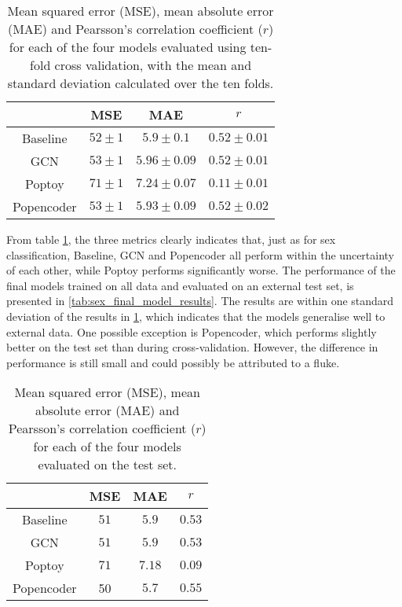 \begin{table}[H]
    \centering
    \caption{Mean squared error (MSE), mean absolute error (MAE) and Pearsson's correlation coefficient ($r$) for each of the four models evaluated using ten-fold cross validation, with the mean and standard deviation calculated over the ten folds.}
    \begin{tabular}{c|c|c|c}
         &  MSE & MAE & $r$ \\ \hline 
        Baseline &$52\pm1$& $5.9\pm0.1$&$0.52\pm0.01$\\
        GCN & $53\pm1$& $5.96\pm 0.09 $& $0.52\pm0.01$\\
        Poptoy &$71\pm 1$ & $7.24\pm0.07$ &$ 0.11\pm 0.01$\\
        Popencoder &$53\pm1$& $5.93\pm 0.09$ & $0.52\pm0.02$\\
    \end{tabular}
    \label{tab:age_model_results}
\end{table}
From table \ref{tab:age_model_results}, the three metrics clearly indicates that, just as for sex classification, Baseline, GCN and Popencoder all perform within the uncertainty of each other, while Poptoy performs significantly worse. The performance of the final models trained on all data and evaluated on an external test set, is presented in \cref{tab:sex_final_model_results}. The results are within one standard deviation of the results in \cref{tab:age_model_results}, which indicates that the models generalise well to external data. One possible exception is Popencoder, which performs slightly better on the test set than during cross-validation. However, the difference in performance is still small and could possibly be attributed to a fluke.

\begin{table}[H]
    \centering
    \caption{Mean squared error (MSE), mean absolute error (MAE) and Pearsson's correlation coefficient ($r$) for each of the four models evaluated on the test set.}
    \begin{tabular}{c|c|c|c}
         &  MSE & MAE & $r$ \\ \hline 
        Baseline & $51 $& $5.9 $&$0.53 $\\
        GCN & $51 $& $5.9  $& $0.53 $\\
        Poptoy &$71 $ & $7.18 $ &$ 0.09 $\\
        Popencoder &50 & $5.7 $ & $0.55 $\\
    \end{tabular}
    \label{tab:age_final_model_results}
\end{table}

